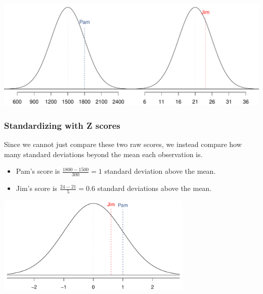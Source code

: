 \begin{frame}
\frametitle{}


\begin{center}
\includegraphics[width=\textwidth]{4-1_normal_distribution/figures/satActNormals/satActNormals}
\end{center}

\end{frame}


\begin{frame}
\frametitle{Standardizing with Z scores}

Since we cannot just compare these two raw scores, we instead compare how many standard deviations beyond the mean each observation is.

\begin{itemize}

\item Pam's score is $\frac{1800 - 1500}{300} = 1$ standard deviation above the mean.

\item Jim's score is $\frac{24 - 21}{5} = 0.6$ standard deviations above the mean.

\end{itemize}

\begin{center}
\includegraphics[width=0.7\textwidth]{4-1_normal_distribution/figures/satActNormals/satActNormalsStandardized}
\end{center}

\end{frame}

